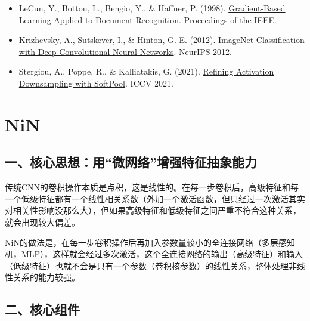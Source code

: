 \vspace{0.25em}
\begin{itemize}
\tightlist
\item
  LeCun, Y., Bottou, L., Bengio, Y., \& Haffner, P. (1998). \href{http://yann.lecun.com/exdb/publis/pdf/lecun-98.pdf}{Gradient-Based Learning Applied to Document Recognition}. Proceedings of the IEEE.
\item
  Krizhevsky, A., Sutskever, I., \& Hinton, G. E. (2012). \href{https://papers.nips.cc/paper/4824-imagenet-classification-with-deep-convolutional-neural-networks}{ImageNet Classification with Deep Convolutional Neural Networks}. NeurIPS 2012.
\item
  Stergiou, A., Poppe, R., \& Kalliatakis, G. (2021). \href{https://arxiv.org/abs/2101.00440}{Refining Activation Downsampling with SoftPool}. ICCV 2021.
\end{itemize}

\clearpage

\hypertarget{nin}{%
\section{NiN}\label{nin}}

\hypertarget{ux4e00ux6838ux5fc3ux601dux60f3ux7528ux5faeux7f51ux7edcux589eux5f3aux7279ux5f81ux62bdux8c61ux80fdux529b}{%
\subsection{一、核心思想：用``微网络''增强特征抽象能力}\label{ux4e00ux6838ux5fc3ux601dux60f3ux7528ux5faeux7f51ux7edcux589eux5f3aux7279ux5f81ux62bdux8c61ux80fdux529b}}

传统CNN的卷积操作本质是点积，这是线性的。在每一步卷积后，高级特征和每一个低级特征都有一个线性相关系数（外加一个激活函数，但只经过一次激活其实对相关性影响没那么大），但如果高级特征和低级特征之间严重不符合这种关系，就会出现较大偏差。

NiN的做法是，在每一步卷积操作后再加入参数量较小的全连接网络（多层感知机，MLP），这样就会经过多次激活，这个全连接网络的输出（高级特征）和输入（低级特征）也就不会是只有一个参数（卷积核参数）的线性关系，整体处理非线性关系的能力较强。

\hypertarget{ux4e8cux6838ux5fc3ux7ec4ux4ef6-1}{%
\subsection{二、核心组件}\label{ux4e8cux6838ux5fc3ux7ec4ux4ef6-1}}

